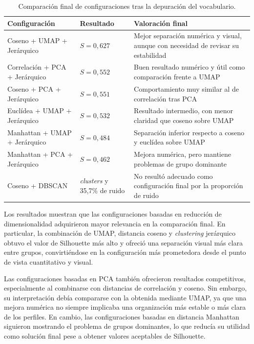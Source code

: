 \documentclass[11pt,spanish,listoffigures,listoftables]{tfgetsinf}
\begin{document}
\begin{table}[H]
\centering
\small
\renewcommand{\arraystretch}{1.25}
\begin{tabular}{
>{\centering\arraybackslash}m{}
>{\centering\arraybackslash}m{}
m{}
}
\hline
\textbf{Configuración} & \textbf{Resultado} & \textbf{Valoración final} \\
\hline
Coseno + UMAP + Jerárquico & \(S=0,627\) & Mejor separación numérica y visual, aunque con necesidad de revisar su estabilidad \\
\hline
Correlación + PCA + Jerárquico & \(S=0,552\) & Buen resultado numérico y útil como comparación frente a UMAP \\
\hline
Coseno + PCA + Jerárquico & \(S=0,551\) & Comportamiento muy similar al de correlación tras PCA \\
\hline
Euclídea + UMAP + Jerárquico & \(S=0,532\) & Resultado intermedio, con menor claridad que coseno sobre UMAP \\
\hline
Manhattan + UMAP + Jerárquico & \(S=0,484\) & Separación inferior respecto a coseno y euclídea sobre UMAP \\
\hline
Manhattan + PCA + Jerárquico & \(S=0,462\) & Mejora numérica, pero mantiene problemas de grupo dominante \\
\hline
Coseno + DBSCAN & 2 \textit{clusters} y 35,7\% de ruido & No resultó adecuado como configuración final por la proporción de ruido \\
\hline
\end{tabular}
\caption{Comparación final de configuraciones tras la depuración del vocabulario.}
\label{tab:comparacion_final_configuraciones}
\end{table}

Los resultados muestran que las configuraciones basadas en reducción de dimensionalidad adquirieron mayor relevancia en la comparación final. En particular, la combinación de UMAP, distancia coseno y \textit{clustering} jerárquico obtuvo el valor de Silhouette más alto y ofreció una separación visual más clara entre grupos, convirtiéndose en la configuración más prometedora desde el punto de vista cuantitativo y visual.

Las configuraciones basadas en PCA también ofrecieron resultados competitivos, especialmente al combinarse con distancias de correlación y coseno. Sin embargo, su interpretación debía compararse con la obtenida mediante UMAP, ya que una mejora numérica no siempre implicaba una organización más estable o más clara de los perfiles. En cambio, las configuraciones basadas en distancia Manhattan siguieron mostrando el problema de grupos dominantes, lo que reducía su utilidad como solución final pese a obtener valores aceptables de Silhouette.
\end{document}
